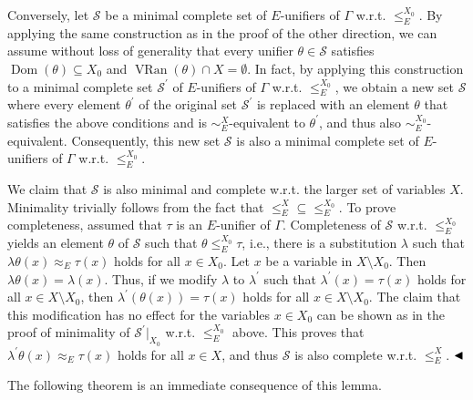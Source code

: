 \documentclass[10pt,a4paper]{amsart}
\begin{document}
Conversely, let $\mathcal{S}$ be a minimal complete set of $E$-unifiers of $\Gamma$ w.r.t. $\leq_{E}^{X_{0}}$. By applying the same construction as in the proof of the other direction, we can assume without loss of generality that every unifier $\theta\in\mathcal{S}$ satisfies $\operatorname{Dom}(\theta)\subseteq X_{0}$ and $\operatorname{VRan}(\theta)\cap X=\emptyset$. In fact, by applying this construction to a minimal complete set $\mathcal{S}^{\prime}$ of $E$-unifiers of $\Gamma$ w.r.t. $\leq_{E}^{X_{0}}$, we obtain a new set $\mathcal{S}$ where every element $\theta^{\prime}$ of the original set $\mathcal{S}^{\prime}$ is replaced with an element $\theta$ that satisfies the above conditions and is $\sim_{E}^{X}$-equivalent to $\theta^{\prime}$, and thus also $\sim_{E}^{X_{0}}$-equivalent. Consequently, this new set $\mathcal{S}$ is also a minimal complete set of $E$-unifiers of $\Gamma$ w.r.t. $\leq_{E}^{X_{0}}$.\par
 
 
 
We claim that $\mathcal{S}$ is also minimal and complete w.r.t. the larger set of variables $X$. Minimality trivially follows from the fact that ${\leq_{E}^{X}}\subseteq{\leq_{E}^{X_{0}}}$. To prove completeness, assumed that $\tau$ is an $E$-unifier of $\Gamma$. Completeness of $\mathcal{S}$ w.r.t. $\leq_{E}^{X_{0}}$ yields an element $\theta$ of $\mathcal{S}$ such that $\theta\leq_{E}^{X_{0}}\tau$, i.e., there is a substitution $\lambda$ such that $\lambda\theta(x)\approx_{E}\tau(x)$ holds for all $x\in X_{0}$. Let $x$ be a variable in $X\setminus X_{0}$. Then $\lambda\theta(x)=\lambda(x)$. Thus, if we modify $\lambda$ to $\lambda^{\prime}$ such that $\lambda^{\prime}(x)=\tau(x)$ holds for all $x\in X\setminus X_{0}$, then $\lambda^{\prime}(\theta(x))=\tau(x)$ holds for all $x\in X\setminus X_{0}$. The claim that this modification has no effect for the variables $x\in X_{0}$ can be shown as in the proof of minimality of $\mathcal{S}^{\prime}|_{X_{0}}$ w.r.t. $\leq_{E}^{X_{0}}$ above. This proves that $\lambda^{\prime}\theta(x)\approx_{E}\tau(x)$ holds for all $x\in X$, and thus $\mathcal{S}$ is also complete w.r.t. $\leq_{E}^{X}$. $\hfill\blacktriangleleft$\par
 
 
 
The following theorem is an immediate consequence of this lemma.\par
 
\end{document}
